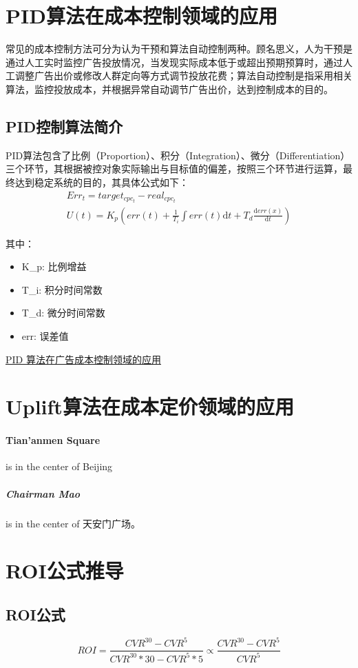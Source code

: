 \section{PID算法在成本控制领域的应用}
常见的成本控制方法可分为认为干预和算法自动控制两种。顾名思义，人为干预是通过人工实时监控广告投放情况，当发现实际成本低于或超出预期预算时，通过人工调整广告出价或修改人群定向等方式调节投放花费；算法自动控制是指采用相关算法，监控投放成本，并根据异常自动调节广告出价，达到控制成本的目的。
\subsection{PID控制算法简介}
PID算法包含了比例（Proportion）、积分（Integration）、微分（Differentiation）三个环节，其根据被控对象实际输出与目标值的偏差，按照三个环节进行运算，最终达到稳定系统的目的，其具体公式如下：
\begin{equation}
    \begin{array}{l}
        Err_{t} = target_{cpc_{t}} - real_{cpc_{t}}\\
        U(t) = K_{p}(err(t) + \frac{1}{T_{i}} \int{err(t)\mathrm{d}t } + T_{d}\frac{\mathrm{d} err(x)}{\mathrm{d} t} )  
    \end{array}
\end{equation}

其中：
\begin{itemize}
    \item K\_{p}: 比例增益
    \item T\_{i}: 积分时间常数
    \item T\_{d}: 微分时间常数
    \item err: 误差值
\end{itemize}
\href{https://www.infoq.cn/article/akkwpvsnium9tmhhuu3f}{PID 算法在广告成本控制领域的应用}

\newpage
\section{Uplift算法在成本定价领域的应用}
\paragraph{Tian'anmen Square}
is in the center of Beijing
\subparagraph{Chairman Mao}
is in the center of 天安门广场。
\newpage
\section{ROI公式推导}
\subsection{ROI公式}
\begin{equation}
    ROI = \frac{CVR^{30} - CVR^{5}}{CVR^{30} * 30 - CVR^{5} * 5}  \propto \frac{CVR^{30} - CVR^{5}}{CVR^{5}}
\end{equation}
